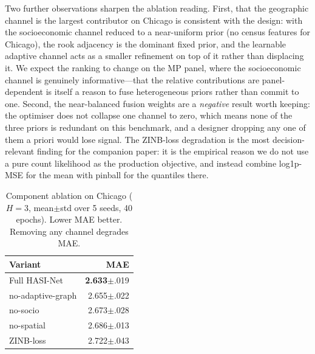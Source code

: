 \documentclass[11pt,conference]{IEEEtran}
\begin{document}
Two further observations sharpen the ablation reading. First, that the
geographic channel is the largest contributor on Chicago is consistent with
the design: with the socioeconomic channel reduced to a near-uniform prior (no
census features for Chicago), the rook adjacency is the dominant fixed prior,
and the learnable adaptive channel acts as a smaller refinement on top of it
rather than displacing it. We expect the ranking to change on the MP panel,
where the socioeconomic channel is genuinely informative---that the relative
contributions are panel-dependent is itself a reason to fuse heterogeneous
priors rather than commit to one. Second, the near-balanced fusion weights
are a \emph{negative} result worth keeping: the optimiser does not collapse
one channel to zero, which means none of the three priors is redundant on this
benchmark, and a designer dropping any one of them a priori would lose signal.
The ZINB-loss degradation is the most decision-relevant finding for the
companion paper: it is the empirical reason we do not use a pure count
likelihood as the production objective, and instead combine log1p-MSE for the
mean with pinball for the quantiles there.

\begin{table}[t]
\centering
\caption{Component ablation on Chicago ($H{=}3$, mean$\pm$std over 5 seeds,
40 epochs). Lower MAE better. Removing any channel degrades MAE.}
\label{tab:ablation}
\begin{tabular}{lr}
\toprule
Variant & MAE\\
\midrule
Full HASI-Net   & \textbf{2.633}$\pm$.019\\
no-adaptive-graph & 2.655$\pm$.022\\
no-socio         & 2.673$\pm$.028\\
no-spatial       & 2.686$\pm$.013\\
ZINB-loss        & 2.722$\pm$.043\\
\bottomrule
\end{tabular}
\end{table}
\end{document}
